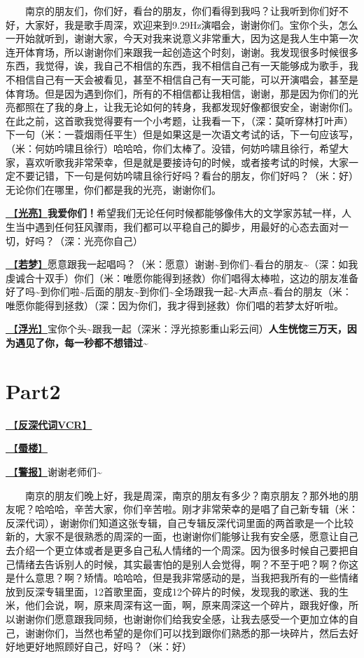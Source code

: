 \documentclass[]{ctexbook}
\begin{document}
  南京的朋友们，你们好，看台的朋友，你们看得到我吗？让我听到你们好不好，大家好，我是歌手周深，欢迎来到9.29Hz演唱会，谢谢你们。宝你个头，怎么一开始就听到，谢谢大家，今天对我来说意义非常重大，因为这是我人生中第一次连开体育场，所以谢谢你们来跟我一起创造这个时刻，谢谢。我发现很多时候很多东西，我觉得，诶，我自己不相信的东西，我不相信自己有一天能够成为歌手，我不相信自己有一天会被看见，甚至不相信自己有一天可能，可以开演唱会，甚至是体育场。但是因为遇到你们，所有的不相信都让我相信，谢谢，那是因为你们的光亮都照在了我的身上，让我无论如何的转身，我都发现好像都很安全，谢谢你们。在此之前，这首歌我觉得要有一个小考题，让我看一下，（深：莫听穿林打叶声）下一句（米：一蓑烟雨任平生）但是如果这是一次语文考试的话，下一句应该写，（米：何妨吟啸且徐行）哈哈哈，你们太棒了。没错，何妨吟啸且徐行，希望大家，喜欢听歌我非常荣幸，但是就是要接诗句的时候，或者接考试的时候，大家一定不要记错，下一句是何妨吟啸且徐行好吗？看台的朋友，你们好吗？（米：好）无论你们在哪里，你们都是我的光亮，谢谢你们。

\hyperref[silver-linings]{🎵【\textbf{光亮}】}\textbf{我爱你们！}希望我们无论任何时候都能够像伟大的文学家苏轼一样，人生当中遇到任何狂风骤雨，我们都可以平稳自己的脚步，用最好的心态去面对一切，好吗？（深：光亮你自己）

\hyperref[ruomeng]{🎵【\textbf{若梦}】}愿意跟我一起唱吗？（米：愿意）谢谢\textasciitilde 到你们\textasciitilde 看台的朋友\textasciitilde（深：如我虔诚合十双手）你们（米：唯愿你能得到拯救）你们唱得太棒啦，这边的朋友准备好了吗\textasciitilde 到你们啦\textasciitilde 后面的朋友\textasciitilde 到你们\textasciitilde 全场跟我一起\textasciitilde 大声点\textasciitilde 看台的朋友（米：唯愿你能得到拯救）（深：因为你们，我才得到拯救）你们唱的若梦太好听啦。

\hyperref[floating-light]{🎵【\textbf{浮光}】}宝你个头\textasciitilde 跟我一起（深米：浮光掠影重山彩云间）\textbf{人生恍惚三万天，因为遇见了你，每一秒都不想错过\textasciitilde{}}

\section{Part2}\label{nanjing-20240811-part2}

\hyperref[senself-vcr]{🎥【\textbf{反深代词VCR}】}

\hyperref[mirage]{🎵【\textbf{蜃楼}】}

\hyperref[the-giver]{🎵【\textbf{警报}】}谢谢老师们\textasciitilde{}

  南京的朋友们晚上好，我是周深，南京的朋友有多少？南京朋友？那外地的朋友呢？哈哈哈，辛苦大家，你们辛苦啦。刚才非常荣幸的是唱了自己新专辑（米：反深代词），谢谢你们知道这张专辑，自己专辑反深代词里面的两首歌是一个比较新的，大家不是很熟悉的周深的一面，也谢谢你们能够让我有安全感，愿意让自己去介绍一个更立体或者是更多自己私人情绪的一个周深。因为很多时候自己要把自己情绪去告诉别人的时候，其实最害怕的是别人会觉得，啊？不至于吧？啊？你这是什么意思？啊？矫情。哈哈哈，但是我非常感动的是，当我把我所有的一些情绪放到反深专辑里面，12首歌里面，变成12个碎片的时候，发现我的歌迷、我的生米，他们会说，啊，原来周深有这一面，啊，原来周深这一个碎片，跟我好像，所以谢谢你们愿意跟我同频，也谢谢你们给我安全感，让我去感受一个更加立体的自己，谢谢你们，当然也希望的是你们可以找到跟你们熟悉的那一块碎片，然后去好好地更好地照顾好自己，好吗？（米：好）
\end{document}
